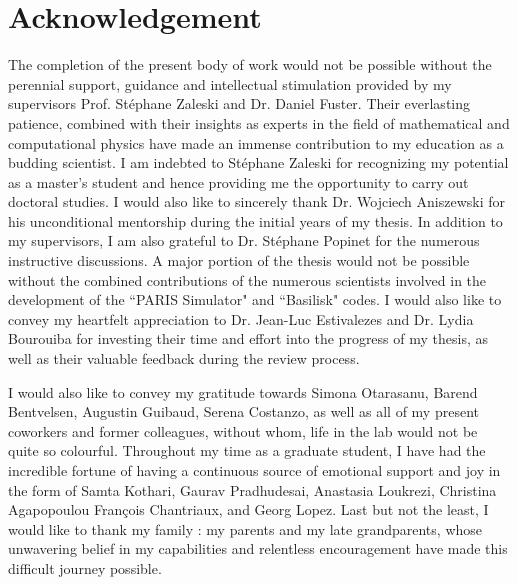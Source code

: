 \chapter*{Acknowledgement}

The completion of the present body of work would not be possible without the perennial support, guidance and intellectual stimulation provided by my supervisors Prof. St\'ephane Zaleski and Dr. Daniel Fuster. Their everlasting patience, combined with their insights as experts in the field of mathematical and computational physics have made an immense contribution to my education as a budding scientist. I am indebted to St\'ephane Zaleski for recognizing my potential as a master's student and hence providing me the opportunity to carry out doctoral studies. I would also like to sincerely thank Dr. Wojciech Aniszewski for his unconditional mentorship during the initial years of my thesis. In addition to my supervisors, I am also grateful to Dr. St\'ephane Popinet for the numerous instructive discussions. A major portion of the thesis would not be possible without the combined contributions of the numerous scientists involved in the development of the ``PARIS Simulator" and ``Basilisk" codes. I would also like to convey my heartfelt appreciation to Dr. Jean-Luc Estivalezes and Dr. Lydia Bourouiba for investing their time and effort into the progress of my thesis, as well as their valuable feedback during the review process. 

I would also like to convey my gratitude towards Simona Otarasanu, Barend Bentvelsen, Augustin Guibaud, Serena Costanzo, as well as all of my present coworkers and former colleagues, without whom, life in the lab would not be quite so colourful. Throughout my time as a graduate student, I have had the incredible fortune of having a continuous source of emotional support and joy in the form of Samta Kothari, Gaurav Pradhudesai, Anastasia Loukrezi, Christina Agapopoulou François Chantriaux, and Georg Lopez.  
Last but not the least, I would like to thank my family : my parents and my late grandparents, whose unwavering belief in my capabilities and relentless encouragement have made this difficult journey possible.    
